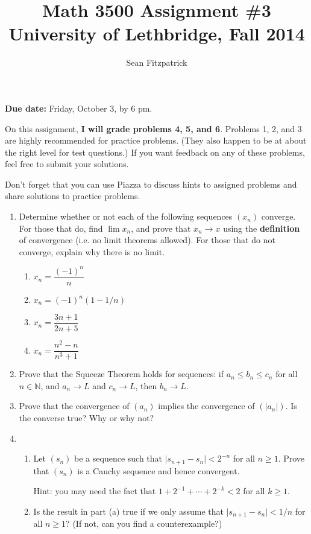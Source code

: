 \documentclass[letterpaper,12pt]{article}
\title{Math 3500 Assignment \#3\\University of Lethbridge, Fall 2014}
\author{Sean Fitzpatrick}
\newcommand{\N}{\mathbb{N}}
\newcommand{\abs}[1]{\lvert #1\rvert}
\begin{document}
 \maketitle

{\bf Due date:} Friday, October 3, by 6 pm.

\bigskip

On this assignment, {\bf I will grade problems 4, 5, and 6}. Problems 1, 2, and 3 are highly recommended for practice problems. (They also happen to be at about the right level for test questions.) If you want feedback on any of these problems, feel free to submit your solutions.

Don't forget that you can use Piazza to discuss hints to assigned problems and share solutions to practice problems.

\begin{enumerate}
 \item Determine whether or not each of the following sequences $(x_n)$ converge. For those that do, find $\lim x_n$, and prove that $x_n\to x$ using the {\bf definition} of convergence (i.e. no limit theorems allowed). For those that do not converge, explain why there is no limit.
\begin{enumerate}
 \item $x_n = \dfrac{(-1)^n}{n}$
 \item $x_n = (-1)^n(1-1/n)$
 \item $x_n = \dfrac{3n+1}{2n+5}$
 \item $x_n = \dfrac{n^2-n}{n^3+1}$
\end{enumerate}
\item Prove that the Squeeze Theorem holds for sequences: if $a_n\leq b_n\leq c_n$ for all $n\in \N$, and $a_n\to L$ and $c_n\to L$, then $b_n\to L$.
 \item Prove that the convergence of $(a_n)$ implies the convergence of $(\abs{a_n})$. Is the converse true? Why or why not?
 \item \begin{enumerate}
        \item Let $(s_n)$ be a sequence such that $\abs{s_{n+1}-s_n}<2^{-n}$ for all $n\geq 1$. Prove that $(s_n)$ is a Cauchy sequence and hence convergent. 

Hint: you may need the fact that $1+2^{-1}+\cdots + 2^{-k} <2$ for all $k\geq 1$.
	\item Is the result in part (a) true if we only assume that $\abs{s_{n+1}-s_n}<1/n$ for all $n\geq 1$? (If not, can you find a counterexample?)
       \end{enumerate}



\end{enumerate}
\end{document}
